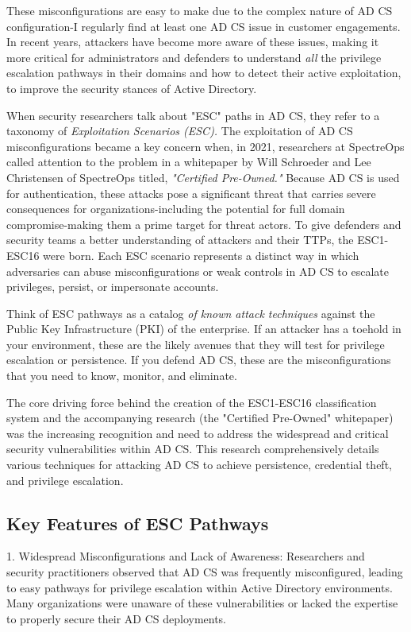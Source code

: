 {These misconfigurations are easy to make due to the complex nature of AD CS configuration-I regularly find at least one AD CS issue in customer engagements. In recent years, attackers have become more aware of these issues, making it more critical for administrators and defenders to understand \textit{all} the privilege escalation pathways in their domains and how to detect their active exploitation, to improve the security stances of Active Directory.

When security researchers talk about "ESC" paths in AD CS, they refer to a taxonomy of \textit{Exploitation Scenarios (ESC).} The exploitation of AD CS misconfigurations became a key concern when, in 2021, researchers at SpectreOps called attention to the problem in a whitepaper by Will Schroeder and Lee Christensen of SpectreOps titled, \textit{"Certified Pre-Owned."}  Because AD CS is used for authentication, these attacks pose a significant threat that carries severe consequences for organizations-including the potential for full domain compromise-making them a prime target for threat actors. To give defenders and security teams a better understanding of attackers and their TTPs, the ESC1-ESC16 were born. Each ESC scenario represents a distinct way in which adversaries can abuse misconfigurations or weak controls in AD CS to escalate privileges, persist, or impersonate accounts.

Think of ESC pathways as a catalog \textit{ of known attack techniques} against the Public Key Infrastructure (PKI) of the enterprise. If an attacker has a toehold in your environment, these are the likely avenues that they will test for privilege escalation or persistence. If you defend AD CS, these are the misconfigurations that you need to know, monitor, and eliminate.

The core driving force behind the creation of the ESC1-ESC16 classification system and the accompanying research (the "Certified Pre-Owned" whitepaper) was the increasing recognition and need to address the widespread and critical security vulnerabilities within AD CS. This research comprehensively details various techniques for attacking AD CS to achieve persistence, credential theft, and privilege escalation.

\subsection{Key Features of ESC Pathways}
1. Widespread Misconfigurations and Lack of Awareness:
Researchers and security practitioners observed that AD CS was frequently misconfigured, leading to easy pathways for privilege escalation within Active Directory environments. Many organizations were unaware of these vulnerabilities or lacked the expertise to properly secure their AD CS deployments.

}

